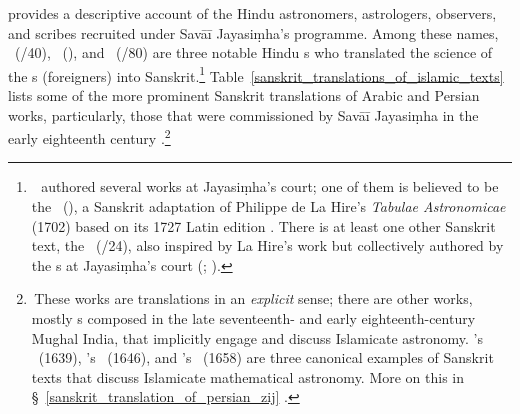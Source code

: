\textcite{SharmaSawaiJaiSingh} provides a descriptive account of the Hindu astronomers, astrologers, observers, and scribes recruited under Savāī Jayasiṃha's programme. Among these names, \Jagannathafull\ (\fl {}/40), \Nayanasukhopadhyaya\ (), and \Kevlaramafull\ (\fl {}/80) are three notable Hindu \jyotisa s who translated the science of the \yavana s (foreigners) into Sanskrit.\footnote{\,\Kevalarama\ authored several works at Jayasiṃha's court; one of them is believed to be the \Drkpaksasarani\ (), a Sanskrit adaptation of Philippe de La Hire's \textit{Tabulae Astronomicae} (1702) based on its 1727 Latin edition 
\parencite{PingreeLaHireSanskrit}. There is at least one other Sanskrit text, the \Phirangicandracchedyopayogika\ (/24), also inspired by La Hire's work but collectively authored by the \jyotisa s at Jayasiṃha's court (\cite[248--249]{SAT_Montelle_Plofker}; \cite{PingreeLaHireJaysimha}).\label{kevalarama_works_foreign}} %
Table~\ref{sanskrit_translations_of_islamic_texts} lists some of the more prominent Sanskrit translations of  Arabic and Persian works, particularly, those that were commissioned by Savāī Jayasiṃha in the early eighteenth century \parencite[131--151]{PingreeJaipur}.\footnote{\,These works are translations in an \textit{explicit} sense; there are other works, mostly \siddhanta s composed in the late seventeenth- and early eighteenth-century Mughal India, that implicitly engage and discuss Islamicate astronomy. \Nityananda's \Sarvasiddhantaraja\ (1639), \Munisvara's \Siddhantasarvabhauma\ (1646), and \Kamalakara's \Siddhantatattvaviveka\ (1658) are three canonical examples of Sanskrit texts that discuss Islamicate mathematical astronomy. More on this in \S~\ref{sanskrit_translation_of_persian_zij} \label{explicit_implicit_translation_sanskrit}.}


